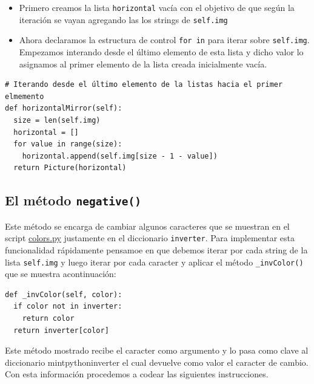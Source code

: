 \documentclass[10pt, a4paper]{article}
\newcommand{\mintpython}[1]{\texttt{#1}}
\begin{document}
\begin{itemize}
  \item Primero creamos la lista \mintpython{horizontal} vacía con el objetivo de que según la iteración se vayan agregando las los strings de \mintpython{self.img}
  \item Ahora declaramos la estructura de control \mintpython{for in} para iterar sobre \mintpython{self.img}. Empezamos interando desde el último elemento de esta lista y dicho valor lo asignamos al primer elemento de la lista creada inicialmente vacía.
\end{itemize}

\begin{verbatim}
# Iterando desde el último elemento de la listas hacia el primer elmemento
def horizontalMirror(self):
  size = len(self.img)
  horizontal = []
  for value in range(size):
    horizontal.append(self.img[size - 1 - value])
  return Picture(horizontal)
\end{verbatim}

\subsection{El método \mintpython{negative()}}
Este método se encarga de cambiar algunos caracteres que se muestran en el script \href{https://github.com/jorghee/chess-with-python/blob/main/colors.py}{colors.py} justamente en el diccionario \mintpython{inverter}.
\singlespacing
Para implementar esta funcionalidad rápidamente pensamoe en que debemos iterar por cada string de la lista \mintpython{self.img} y luego iterar por cada caracter y aplicar el método \mintpython{\_invColor()} que se muestra acontinuación:

\begin{verbatim}
def _invColor(self, color):
  if color not in inverter:
    return color
  return inverter[color]
\end{verbatim}

Este método mostrado recibe el caracter como argumento y lo pasa como clave al diccionario mintpython{inverter} el cual devuelve como valor el caracter de cambio.
\singlespacing
Con esta información procedemos a codear las siguientes instrucciones.
\end{document}
